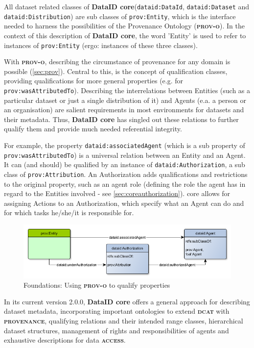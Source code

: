 \documentclass[a4paper,english,twoside,BCOR1.5cm,headsepline,DIV12,appendixprefix,final,12pt]{scrbook}
\newcommand{\provenance}{{\ttfamily\scshape\bfseries provenance}\xspace}
\newcommand{\access}{{\ttfamily\scshape\bfseries access}\xspace}
\newcommand{\core}{{\ttfamily\bfseries DataID core}\xspace}
\newcommand{\prov}{{\scshape\bfseries prov-o}\xspace}
\newcommand{\dcat}{{\scshape\bfseries dcat}\xspace}
\newcommand{\prop}[1]{{{\texttt{#1}}}}
\begin{document}
All dataset related classes of \core (\prop{dataid:DataId}, \prop{dataid:Dataset} and \prop{dataid:Distribution}) are sub classes of \prop{prov:Entity}, which is the interface needed to harness the possibilities of the Provenance Ontology (\prov). In the context of this description of \core, the word 'Entity' is used to refer to instances of \prop{prov:Entity} (ergo: instances of these three classes).

With \prov, describing the circumstance of provenance for any domain is possible (\cref{sec:prov}). Central to this, is the concept of qualification classes, providing qualifications for more general properties (e.g. for \prop{prov:wasAttributedTo}). Describing the interrelations between Entities (such as a particular dataset or just a single distribution of it) and Agents (e.a. a person or an organisation) are salient requirements in most environments for datasets and their metadata. Thus, \core has singled out these relations to further qualify them and provide much needed referential integrity.

For example, the property \prop{dataid:associatedAgent} (which is a sub property of \prop{prov:wasAttributedTo}) is a universal relation between an Entity and an Agent. It can (and should) be qualified by an instance of \prop{dataid:Authorization}, a sub class of \prop{prov:Attribution}. An Authorization adds qualifications and restrictions to the original property, such as an agent role (defining the role the agent has in regard to the Entities involved - see \cref{sec:coreauthorization}). core allows for assigning Actions to an Authorization, which specify what an Agent can do and for which tasks he/she/it is responsible for.

\begin{figure}[!htbp]
\centering
  \includegraphics[width=\textwidth]{images/FoundationalConseptProv.png}
  \caption{Foundations: Using \prov to qualify properties}
  \label{fig:foundations}
\end{figure}

In its current version 2.0.0, \core offers a general approach for describing dataset metadata, incorporating important ontologies to extend \dcat with \provenance, qualifying relations and their intended range classes, hierarchical dataset structures, management of rights and responsibilities of agents and exhaustive descriptions for data \access. 
\end{document}
